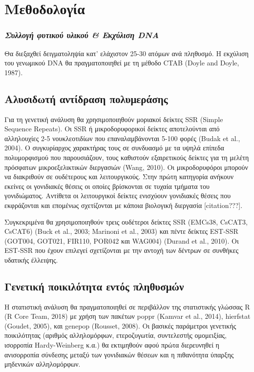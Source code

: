 \documentclass[12pt,a4paper,]{report}
\begin{document}
\section{Μεθοδολογία}

\hypertarget{----dna}{%
\subsubsection{\texorpdfstring{\emph{Συλλογή φυτικού υλικού \& Εκχύλιση
DNA}}{Συλλογή φυτικού υλικού \& Εκχύλιση DNA}}\label{----dna}}

Θα διεξαχθεί δειγματοληψία κατ' ελάχιστον 25-30 ατόμων ανά πληθυσμό. Η
εκχύλιση του γενωμικού DNA θα πραγματοποιηθεί με τη μέθοδο CTAB (Doyle
and Doyle, 1987).

\hypertarget{--}{%
\subsection{Αλυσιδωτή αντίδραση πολυμεράσης}\label{--}}

Για τη γενετική ανάλυση θα χρησιμοποιηθούν μοριακοί δείκτες SSR (Simple
Sequence Repeats). Οι SSR ή μικροδορυφορικοί δείκτες αποτελούνται από
αλληλουχίες 2-5 νουκλεοτιδίων που επαναλαμβάνονται 5-100 φορές (Budak et
al., 2004). Ο συγκυρίαρχος χαρακτήρας τους σε συνδυασμό με τα υψηλά
επίπεδα πολυμορφισμού που παρουσιάζουν, τους καθιστούν εξαιρετικούς
δείκτες για τη μελέτη πρόσφατων μικροεξελικτικών διεργασιών (Wang,
2010). Οι μικροδορυφόροι μπορούν να διακριθούν σε ουδέτερους και
λειτουργικούς. Στην πρώτη κατηγορία ανήκουν εκείνες οι γονιδιακές θέσεις
οι οποίες βρίσκονται σε τυχαία τμήματα του γονιδιώματος. Αντίθετα οι
λειτουργικοί δείκτες ενισχύουν γονιδιακές θέσεις που εκφράζονται και
επομένως σχετίζονται με κάποια βιολογική διεργασία {[}citation???{]}.

Συγκεκριμένα θα χρησιμοποιηθούν τρεις ουδέτεροι δείκτες SSR (EMCs38,
CsCAT3, CsCAT6) (Buck et al., 2003; Marinoni et al., 2003) και πέντε
δείκτες EST-SSR (GOT004, GOT021, FIR110, POR042 και WAG004) (Durand et
al., 2010). Οι EST-SSR που έχουν επιλεγεί σχετίζονται με την αντοχή των
δέντρων σε συνθήκες υδατικής έλλειψης.

\hypertarget{---}{%
\subsection{Γενετική ποικιλότητα εντός πληθυσμών}\label{---}}

Η στατιστική ανάλυση θα πραγματοποιηθεί σε περιβάλλον της στατιστικής
γλώσσας R (R Core Team, 2018) με χρήση των πακέτων poppr (Kamvar et al.,
2014), hierfstat (Goudet, 2005), και genepop (Rousset, 2008). Οι βασικές
παράμετροι γενετικής ποικιλότητας (αριθμός αλληλομόρφων, ετεροζυγωτία,
συντελεστής ομομειξίας, ισορροπία Hardy-Weinberg κ.α.) θα εκτιμηθούν
αφού πρώτα διερευνηθεί η ανισορροπία σύνδεσης μεταξύ των γονιδιακών
θέσεων και η πιθανότητα ύπαρξης μηδενικών αλληλομόρφων.
\end{document}
